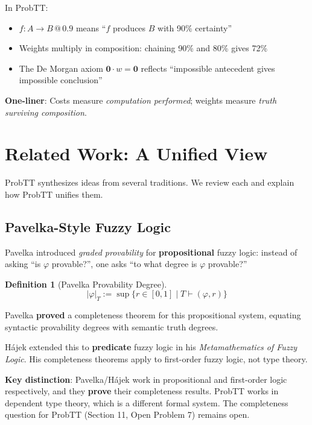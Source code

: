 \documentclass[11pt,a4paper]{article}
\makeatletter
\newtheorem{definition}{Definition}[section]
\newcommand{\at}[1]{\,@\,#1}
\newcommand{\zero}{\mathbf{0}}
\makeatother
\begin{document}
In ProbTT:
\begin{itemize}
    \item $f : A \to B \at{0.9}$ means ``$f$ produces $B$ with 90\% certainty''
    \item Weights multiply in composition: chaining 90\% and 80\% gives 72\%
    \item The De Morgan axiom $\zero \cdot w = \zero$ reflects ``impossible antecedent gives impossible conclusion''
\end{itemize}

\textbf{One-liner}: Costs measure \emph{computation performed}; weights measure \emph{truth surviving composition}.

\section{Related Work: A Unified View}

ProbTT synthesizes ideas from several traditions. We review each and explain how ProbTT unifies them.

\subsection{Pavelka-Style Fuzzy Logic}

Pavelka \citep{pavelka1979fuzzy} introduced \emph{graded provability} for \textbf{propositional} fuzzy logic: instead of asking ``is $\varphi$ provable?'', one asks ``to what degree is $\varphi$ provable?''

\begin{definition}[Pavelka Provability Degree]
\[
|\varphi|_T := \sup\{r \in [0,1] \mid T \vdash (\varphi, r)\}
\]
\end{definition}

Pavelka \textbf{proved} a completeness theorem for this propositional system, equating syntactic provability degrees with semantic truth degrees.

H\'ajek \citep{hajek1998metamathematics} extended this to \textbf{predicate} fuzzy logic in his \emph{Metamathematics of Fuzzy Logic}. His completeness theorems apply to first-order fuzzy logic, not type theory.

\textbf{Key distinction}: Pavelka/H\'ajek work in propositional and first-order logic respectively, and they \textbf{prove} their completeness results. ProbTT works in dependent type theory, which is a different formal system. The completeness question for ProbTT (Section 11, Open Problem 7) remains open.
\end{document}
